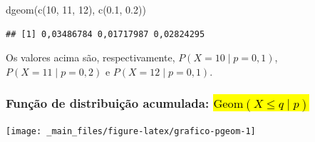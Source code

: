 \documentclass[
  11pt]{report}
\newenvironment{Shaded}{\begin{snugshade}}{\end{snugshade}}
\newcommand{\DecValTok}[1]{\textcolor[rgb]{0.00,0.00,0.81}{#1}}
\newcommand{\FloatTok}[1]{\textcolor[rgb]{0.00,0.00,0.81}{#1}}
\newcommand{\FunctionTok}[1]{\textcolor[rgb]{0.00,0.00,0.00}{#1}}
\newcommand{\NormalTok}[1]{#1}
\renewenvironment{Shaded}{
    \begin{mdframed}[%
      roundcorner=2pt,%
      innerleftmargin=5pt,%
      innerrightmargin=5pt,%
      topline=true,%
      leftline=true,%
      rightline=true,%
      bottomline=true,%
      linewidth=0.5pt,%
      linecolor=black!20,%
      backgroundcolor=black!2,%
      skipabove=2ex,%
      skipbelow=2.5ex%
    ]%
  }
  {
    \end{mdframed}
  }
\begin{document}
\begin{itemize}
\begin{Shaded}
\begin{Highlighting}[]
\FunctionTok{dgeom}\NormalTok{(}\FunctionTok{c}\NormalTok{(}\DecValTok{10}\NormalTok{, }\DecValTok{11}\NormalTok{, }\DecValTok{12}\NormalTok{), }\FunctionTok{c}\NormalTok{(}\FloatTok{0.1}\NormalTok{, }\FloatTok{0.2}\NormalTok{))}
\end{Highlighting}
\end{Shaded}

\begin{verbatim}
## [1] 0,03486784 0,01717987 0,02824295
\end{verbatim}

  Os valores acima são, respectivamente, $P(X = 10 \mid p = 0{,}1)$, $P(X = 11 \mid p = 0{,}2)$ e $P(X = 12 \mid p = 0{,}1)$.
\end{itemize}

\hypertarget{funuxe7uxe3o-de-distribuiuxe7uxe3o-acumulada-textgeomx-leq-q-mid-p}{%
\subsubsection*{\texorpdfstring{Função de distribuição acumulada: {\hl{$\text{Geom}(X \leq q \mid p)$}}}{Função de distribuição acumulada: }}\label{funuxe7uxe3o-de-distribuiuxe7uxe3o-acumulada-textgeomx-leq-q-mid-p}}

\begin{center}\texttt{[image: \_main\_files/figure-latex/grafico-pgeom-1]} \end{center}
\end{document}
